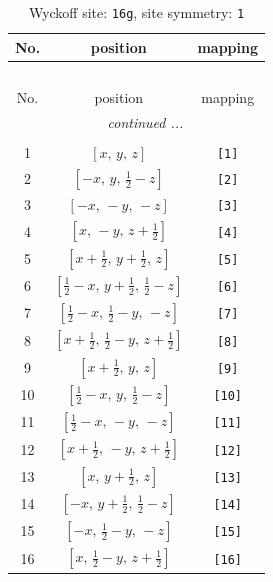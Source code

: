 \documentclass[fleqn,8pt]{jsarticle}
\begin{document}
\begin{longtable}{ccc}
\caption{Wyckoff site: {\tt 16g}, site symmetry: {\tt 1}}
 \\
 \hline \hline
No. & position & mapping \\ \hline \endfirsthead

\multicolumn{2}{l}{\tablename\ \thetable{}} \\
 \hline \hline
No. & position & mapping \\ \hline \endhead

 \hline \hline
\multicolumn{2}{r}{\footnotesize\it continued ...} \\ \endfoot

 \hline \hline
\multicolumn{2}{r}{} \\ \endlastfoot

1 & $\left[ x,\, y,\, z \right]$ & {\tt [1]} \\ \hline
2 & $\left[ - x,\, y,\, \frac{1}{2} - z \right]$ & {\tt [2]} \\ \hline
3 & $\left[ - x,\, - y,\, - z \right]$ & {\tt [3]} \\ \hline
4 & $\left[ x,\, - y,\, z + \frac{1}{2} \right]$ & {\tt [4]} \\ \hline
5 & $\left[ x + \frac{1}{2},\, y + \frac{1}{2},\, z \right]$ & {\tt [5]} \\ \hline
6 & $\left[ \frac{1}{2} - x,\, y + \frac{1}{2},\, \frac{1}{2} - z \right]$ & {\tt [6]} \\ \hline
7 & $\left[ \frac{1}{2} - x,\, \frac{1}{2} - y,\, - z \right]$ & {\tt [7]} \\ \hline
8 & $\left[ x + \frac{1}{2},\, \frac{1}{2} - y,\, z + \frac{1}{2} \right]$ & {\tt [8]} \\ \hline
9 & $\left[ x + \frac{1}{2},\, y,\, z \right]$ & {\tt [9]} \\ \hline
10 & $\left[ \frac{1}{2} - x,\, y,\, \frac{1}{2} - z \right]$ & {\tt [10]} \\ \hline
11 & $\left[ \frac{1}{2} - x,\, - y,\, - z \right]$ & {\tt [11]} \\ \hline
12 & $\left[ x + \frac{1}{2},\, - y,\, z + \frac{1}{2} \right]$ & {\tt [12]} \\ \hline
13 & $\left[ x,\, y + \frac{1}{2},\, z \right]$ & {\tt [13]} \\ \hline
14 & $\left[ - x,\, y + \frac{1}{2},\, \frac{1}{2} - z \right]$ & {\tt [14]} \\ \hline
15 & $\left[ - x,\, \frac{1}{2} - y,\, - z \right]$ & {\tt [15]} \\ \hline
16 & $\left[ x,\, \frac{1}{2} - y,\, z + \frac{1}{2} \right]$ & {\tt [16]} \\
\end{longtable}
\end{document}

